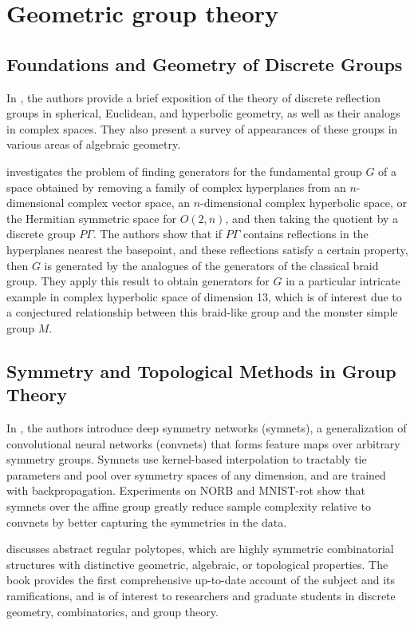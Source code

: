 \documentclass{article}
\begin{document}
\section{Geometric group theory}

\subsection{Foundations and Geometry of Discrete Groups}

In \cite{Dolgachev2006ReflectionGI}, the authors provide a brief exposition of the theory of discrete reflection groups in spherical, Euclidean, and hyperbolic geometry, as well as their analogs in complex spaces. They also present a survey of appearances of these groups in various areas of algebraic geometry.

\cite{Allcock2014GeometricGF} investigates the problem of finding generators for the fundamental group $G$ of a space obtained by removing a family of complex hyperplanes from an $n$-dimensional complex vector space, an $n$-dimensional complex hyperbolic space, or the Hermitian symmetric space for $O(2,n)$, and then taking the quotient by a discrete group $P\Gamma$. The authors show that if $P\Gamma$ contains reflections in the hyperplanes nearest the basepoint, and these reflections satisfy a certain property, then $G$ is generated by the analogues of the generators of the classical braid group. They apply this result to obtain generators for $G$ in a particular intricate example in complex hyperbolic space of dimension 13, which is of interest due to a conjectured relationship between this braid-like group and the monster simple group $M$.

\subsection{Symmetry and Topological Methods in Group Theory}

In \cite{Gens2014DeepSN}, the authors introduce deep symmetry networks (symnets), a generalization of convolutional neural networks (convnets) that forms feature maps over arbitrary symmetry groups. Symnets use kernel-based interpolation to tractably tie parameters and pool over symmetry spaces of any dimension, and are trained with backpropagation. Experiments on NORB and MNIST-rot show that symnets over the affine group greatly reduce sample complexity relative to convnets by better capturing the symmetries in the data.

\cite{McMullen2003AbstractRP} discusses abstract regular polytopes, which are highly symmetric combinatorial structures with distinctive geometric, algebraic, or topological properties. The book provides the first comprehensive up-to-date account of the subject and its ramifications, and is of interest to researchers and graduate students in discrete geometry, combinatorics, and group theory.
\end{document}
